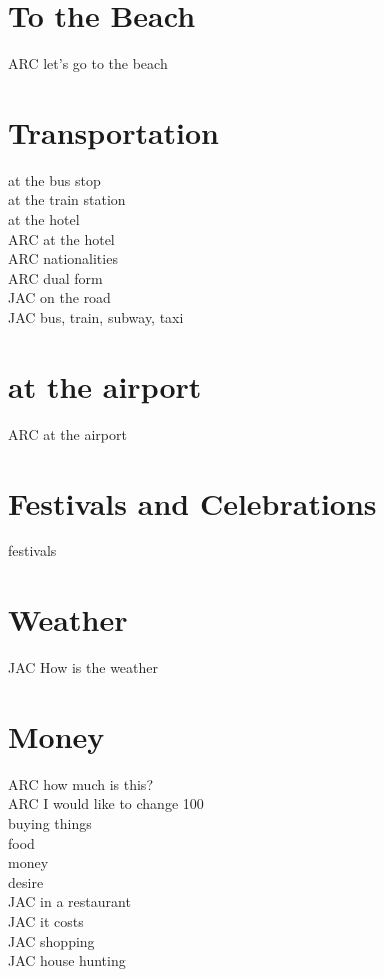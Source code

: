 \chapter{To the Beach}
ARC let's go to the beach\\
\chapter{Transportation}
at the bus stop\\
at the train station\\
at the hotel\\
ARC at the hotel\\
ARC nationalities\\
ARC dual form\\
JAC on the road\\
JAC bus, train, subway, taxi\\
\chapter{at the airport}
ARC at the airport\\
\chapter{Festivals and Celebrations}
festivals\\
\chapter{Weather}
JAC How is the weather\\
\chapter{Money}
ARC how much is this?\\
ARC I would like to change 100\\
buying things\\
food\\
money\\
desire\\
JAC in a restaurant\\
JAC it costs\\
JAC shopping\\
JAC house hunting\\
